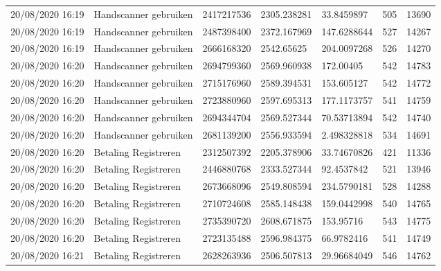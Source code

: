 \begin{tiny}
\begin{longtable}{lllllll}
    20/08/2020 16:19 & Handscanner gebruiken & 2417217536        & 2305.238281 & 33.8459897            & 505              & 13690            \\
    20/08/2020 16:19 & Handscanner gebruiken & 2487398400        & 2372.167969 & 147.6288644           & 527              & 14267            \\
    20/08/2020 16:19 & Handscanner gebruiken & 2666168320        & 2542.65625  & 204.0097268           & 526              & 14270            \\
    20/08/2020 16:20 & Handscanner gebruiken & 2694799360        & 2569.960938 & 172.00405             & 542              & 14783            \\
    20/08/2020 16:20 & Handscanner gebruiken & 2715176960        & 2589.394531 & 153.605127            & 542              & 14772            \\
    20/08/2020 16:20 & Handscanner gebruiken & 2723880960        & 2597.695313 & 177.1173757           & 541              & 14759            \\
    20/08/2020 16:20 & Handscanner gebruiken & 2694344704        & 2569.527344 & 70.53713894           & 542              & 14740            \\
    20/08/2020 16:20 & Handscanner gebruiken & 2681139200        & 2556.933594 & 2.498328818           & 534              & 14691            \\
    20/08/2020 16:20 & Betaling Registreren  & 2312507392        & 2205.378906 & 33.74670826           & 421              & 11336            \\
    20/08/2020 16:20 & Betaling Registreren  & 2446880768        & 2333.527344 & 92.4537842            & 521              & 13946            \\
    20/08/2020 16:20 & Betaling Registreren  & 2673668096        & 2549.808594 & 234.5790181           & 528              & 14288            \\
    20/08/2020 16:20 & Betaling Registreren  & 2710724608        & 2585.148438 & 159.0442998           & 540              & 14765            \\
    20/08/2020 16:20 & Betaling Registreren  & 2735390720        & 2608.671875 & 153.95716             & 543              & 14775            \\
    20/08/2020 16:20 & Betaling Registreren  & 2723135488        & 2596.984375 & 66.9782416            & 541              & 14749            \\
    20/08/2020 16:21 & Betaling Registreren  & 2628263936        & 2506.507813 & 29.96684049           & 546              & 14762            \\

\end{longtable}
\end{tiny}
